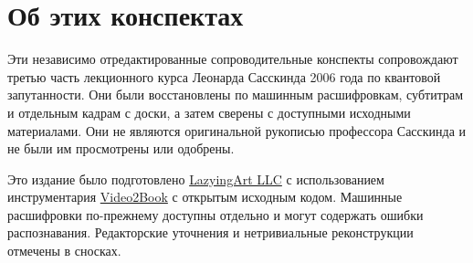 \documentclass[11pt,oneside]{book}
\begin{document}
\frontmatter
\hypersetup{pageanchor=false}

\hypersetup{pageanchor=true}

\clearpage
\chapter*{Об этих конспектах}
Эти независимо отредактированные сопроводительные конспекты сопровождают третью часть лекционного курса Леонарда Сасскинда 2006 года по квантовой запутанности. Они были восстановлены по машинным расшифровкам, субтитрам и отдельным кадрам с доски, а затем сверены с доступными исходными материалами. Они не являются оригинальной рукописью профессора Сасскинда и не были им просмотрены или одобрены.

Это издание было подготовлено \href{https://lazying.art}{LazyingArt LLC} с использованием инструментария \href{https://github.com/lachlanchen/Video2Book}{Video2Book} с открытым исходным кодом. Машинные расшифровки по-прежнему доступны отдельно и могут содержать ошибки распознавания. Редакторские уточнения и нетривиальные реконструкции отмечены в сносках.
\clearpage
\tableofcontents
\mainmatter








\end{document}
